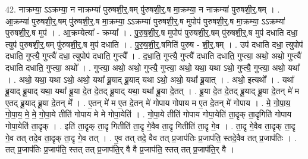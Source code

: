 \documentclass[17pt]{extarticle}
\begin{document}
42. नाक्रम्या॒ ऽऽक्रम्या॒ न नाक्रम्या॑ पुरुषशी॒र्॒.षम् पु॑रुषशी॒र्॒.ष मा॒क्रम्या॒ न नाक्रम्या॑ पुरुषशी॒र्॒.षम् । . आ॒क्रम्या॑ पुरुषशी॒र्॒.षम् पु॑रुषशी॒र्॒.ष मा॒क्रम्या॒ ऽऽक्रम्या॑ पुरुषशी॒र्॒.ष मुपोप॑ पुरुषशी॒र्॒.ष मा॒क्रम्या॒ ऽऽक्रम्या॑ पुरुषशी॒र्॒.ष मुप॑ । . आ॒क्रम्येत्या᳚ - क्रम्या᳚ । . पु॒रु॒ष॒शी॒र्॒.ष मुपोप॑ पुरुषशी॒र्॒.षम् पु॑रुषशी॒र्॒.ष मुप॑ दधाति दधा॒ त्युप॑ पुरुषशी॒र्॒.षम् पु॑रुषशी॒र्॒.ष मुप॑ दधाति । . पु॒रु॒ष॒शी॒र्॒.षमिति॑ पुरुष - शी॒र्॒.षम् । . उप॑ दधाति दधा॒ त्युपोप॑ दधाति॒ गुप्त्यै॒ गुप्त्यै॑ दधा॒ त्युपोप॑ दधाति॒ गुप्त्यै᳚ । . द॒धा॒ति॒ गुप्त्यै॒ गुप्त्यै॑ दधाति दधाति॒ गुप्त्या॒ अथो॒ अथो॒ गुप्त्यै॑ दधाति दधाति॒ गुप्त्या॒ अथो᳚ । . गुप्त्या॒ अथो॒ अथो॒ गुप्त्यै॒ गुप्त्या॒ अथो॒ यथा॒ यथा ऽथो॒ गुप्त्यै॒ गुप्त्या॒ अथो॒ यथा᳚ । . अथो॒ यथा॒ यथा ऽथो॒ अथो॒ यथा᳚ ब्रू॒याद् ब्रू॒याद् यथा ऽथो॒ अथो॒ यथा᳚ ब्रू॒यात् । . अथो॒ इत्यथो᳚ । . यथा᳚ ब्रू॒याद् ब्रू॒याद् यथा॒ यथा᳚ ब्रू॒या दे॒त दे॒तद् ब्रू॒याद् यथा॒ यथा᳚ ब्रू॒या दे॒तत् । . ब्रू॒या दे॒त दे॒तद् ब्रू॒याद् ब्रू॒या दे॒तन् मे॑ म ए॒तद् ब्रू॒याद् ब्रू॒या दे॒तन् मे᳚ । . ए॒तन् मे॑ म ए॒त दे॒तन् मे॑ गोपाय गोपाय म ए॒त दे॒तन् मे॑ गोपाय । . मे॒ गो॒पा॒य॒ गो॒पा॒य॒ मे॒ मे॒ गो॒पा॒ये तीति॑ गोपाय मे मे गोपा॒येति॑ । . गो॒पा॒ये तीति॑ गोपाय गोपा॒येति॑ ता॒दृक् ता॒दृगिति॑ गोपाय गोपा॒येति॑ ता॒दृक् । . इति॑ ता॒दृक् ता॒दृ गितीति॑ ता॒दृ गे॒वैव ता॒दृ गितीति॑ ता॒दृ गे॒व । . ता॒दृ गे॒वैव ता॒दृक् ता॒दृ गे॒व तत् तदे॒व ता॒दृक् ता॒दृ गे॒व तत् । . ए॒व तत् तदे॒ वैव तत् प्र॒जाप॑तिः प्र॒जाप॑ति॒ स्तदे॒वैव तत् प्र॒जाप॑तिः । . तत् प्र॒जाप॑तिः प्र॒जाप॑ति॒ स्तत् तत् प्र॒जाप॑ति॒र् वै वै प्र॒जाप॑ति॒ स्तत् तत् प्र॒जाप॑ति॒र् वै । \newline
\pagebreak
{}
\end{document}
